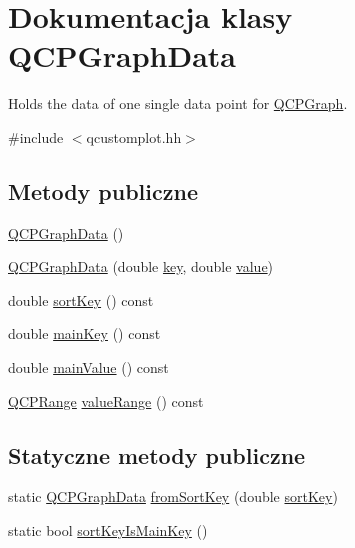 \hypertarget{class_q_c_p_graph_data}{}\section{Dokumentacja klasy Q\+C\+P\+Graph\+Data}
\label{class_q_c_p_graph_data}


Holds the data of one single data point for \hyperlink{class_q_c_p_graph}{Q\+C\+P\+Graph}.  




{\ttfamily \#include $<$qcustomplot.\+hh$>$}

\subsection*{Metody publiczne}
\begin{DoxyCompactItemize}
\item 
\hyperlink{class_q_c_p_graph_data_ac43f7499383d2fa2ffb7a4ad43f76c7c}{Q\+C\+P\+Graph\+Data} ()
\item 
\hyperlink{class_q_c_p_graph_data_a2c32177f12f902f4e05f712837082bd6}{Q\+C\+P\+Graph\+Data} (double \hyperlink{class_q_c_p_graph_data_a2fcebdf84af975761c0661237d7e28ec}{key}, double \hyperlink{class_q_c_p_graph_data_ac97e3ddbdcbe0b58d0b4d6f95250d59c}{value})
\item 
double \hyperlink{class_q_c_p_graph_data_aae097cdf07f2c31edbbc7931e1e2e47f}{sort\+Key} () const 
\item 
double \hyperlink{class_q_c_p_graph_data_a4466437f7f8ddc63f9239fba54f5629a}{main\+Key} () const 
\item 
double \hyperlink{class_q_c_p_graph_data_ad43edfdb885b27e78ec786cc191d4b19}{main\+Value} () const 
\item 
\hyperlink{class_q_c_p_range}{Q\+C\+P\+Range} \hyperlink{class_q_c_p_graph_data_a5eb7d51a8cdccbc38b4f745ca0bdfed9}{value\+Range} () const 
\end{DoxyCompactItemize}
\subsection*{Statyczne metody publiczne}
\begin{DoxyCompactItemize}
\item 
static \hyperlink{class_q_c_p_graph_data}{Q\+C\+P\+Graph\+Data} \hyperlink{class_q_c_p_graph_data_a4646eac7f7a48970ea0fc5153aab0e77}{from\+Sort\+Key} (double \hyperlink{class_q_c_p_graph_data_aae097cdf07f2c31edbbc7931e1e2e47f}{sort\+Key})
\item 
static bool \hyperlink{class_q_c_p_graph_data_a1c98dfd21b82321a173db4ff860dfd21}{sort\+Key\+Is\+Main\+Key} ()
\end{DoxyCompactItemize}
